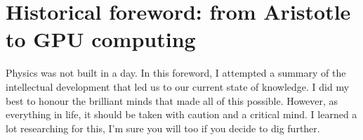 
%
%
%



\newpage

\chapter*{Historical foreword: from Aristotle to GPU computing}


Physics was not built in a day. In this foreword, I attempted a summary of the intellectual development that led us to our current state of knowledge. I did my best to honour the brilliant minds that made all of this possible. However, as everything in life, it should be taken with caution and a critical mind. I learned a lot researching for this, I'm sure you will too if you decide to dig further.

